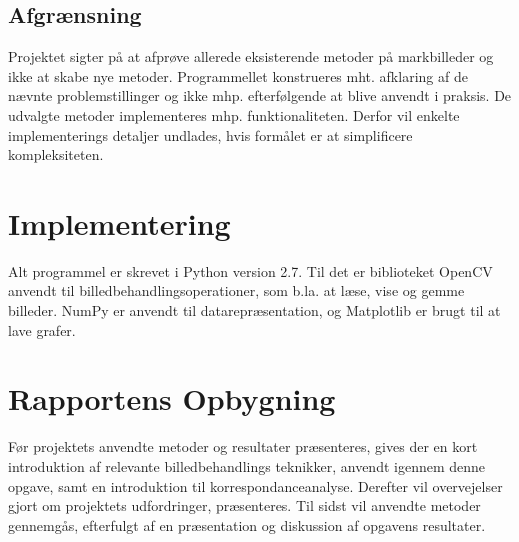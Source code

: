 \subsection{Afgrænsning} \label{subsec:afg}
Projektet sigter på at afprøve allerede eksisterende metoder på markbilleder og ikke at skabe nye metoder. Programmellet konstrueres mht. afklaring af de nævnte problemstillinger
og ikke mhp. efterfølgende at blive anvendt i praksis. De udvalgte metoder implementeres mhp. funktionaliteten. Derfor vil enkelte implementerings detaljer undlades, hvis formålet er at simplificere kompleksiteten.
\section{Implementering}
Alt programmel er skrevet i Python version 2.7. Til det er biblioteket OpenCV anvendt til billedbehandlingsoperationer, som b.la. at læse, vise og gemme billeder. NumPy er anvendt til datarepræsentation, og Matplotlib er brugt til at lave grafer.
\section{Rapportens Opbygning}
Før projektets anvendte metoder og resultater præsenteres, gives der en kort introduktion af relevante billedbehandlings teknikker, anvendt igennem denne opgave, samt en introduktion til  korrespondanceanalyse. Derefter vil overvejelser gjort om projektets udfordringer, præsenteres. Til sidst vil anvendte metoder gennemgås, efterfulgt af en præsentation og diskussion af opgavens resultater.